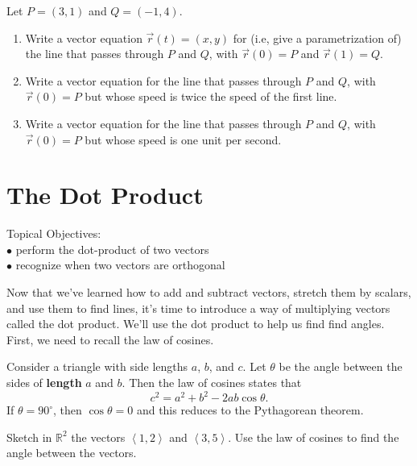 \begin{problem}\label{first line between two points}%
Let $P=(3,1)$ and $Q=(-1,4)$.  
\begin{enumerate}
\item Write a vector equation $\vec r(t)=(x,y)$ for (i.e, give a parametrization of) the line that passes through $P$ and $Q$, with $\vec r(0)=P$ and $\vec r(1)=Q$.
\item Write a vector equation for the line that passes through $P$ and $Q$, with $\vec r(0)=P$ but whose speed is twice the speed of the first line.
\item Write a vector equation for the line that passes through $P$ and $Q$, with $\vec r(0)=P$ but whose speed is one unit per second.
\end{enumerate}
\end{problem}


\section{The Dot Product}
\large Topical Objectives: \normalsize\\
\indent $\bullet$ perform the dot-product of two vectors\\
\indent $\bullet$ recognize when two vectors are orthogonal

\vskip0.2in

Now that we've learned how to add and subtract vectors, stretch them by scalars, and use them to find lines, it's time to introduce a way of multiplying vectors called the dot product.  We'll use the dot product to help us find find angles. First, we need to recall the law of cosines.
\begin{theorem*}
Consider a triangle with side lengths $a$, $b$, and $c$. Let $\theta$ be the angle between the sides of \textbf{length} $a$ and $b$. Then the law of cosines states that 
$$c^2=a^2+b^2-2ab\cos\theta.$$
If $\theta=90^\circ$, then $\cos\theta=0$ and this reduces to the Pythagorean theorem.
\end{theorem*}

\begin{problem} 
%
Sketch in $\mathbb{R}^2$ the vectors $\left<1,2\right>$ and $\left<3,5\right>$.  Use the law of cosines to find the angle between the vectors.
\end{problem}

